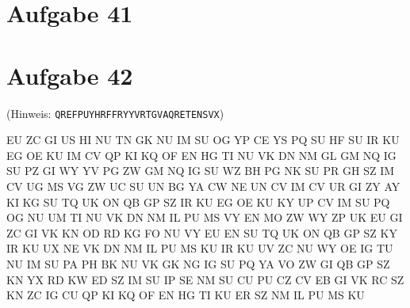 \section*{Aufgabe 41}
\section*{Aufgabe 42}
\begin{minipage}{0.45\textwidth}
\vspace{5em}

(Hinweis: \verb/QREFPUYHRFFRYYVRTGVAQRETENSVX/)
\end{minipage}\hfill\begin{minipage}{0.40\textwidth}
EU ZC GI US HI NU TN GK NU IM SU OG YP CE YS PQ SU HF SU IR KU EG OE KU IM CV
QP KI KQ OF EN HG TI NU VK DN NM GL GM NQ IG SU PZ GI WY YV PG ZW GM NQ IG SU
WZ BH PG NK SU PR GH SZ IM CV UG MS VG ZW UC SU UN BG YA CW NE UN CV IM CV UR
GI ZY AY KI KG SU TQ UK ON QB GP SZ IR KU EG OE KU KY UP CV IM SU PQ OG NU UM
TI NU VK DN NM IL PU MS VY EN MO ZW WY ZP UK EU GI ZC GI VK KN OD RD KG FO NU
VY EU EN SU TQ UK ON QB GP SZ KY IR KU UX NE VK DN NM IL PU MS KU IR KU UV ZC
NU WY OE IG TU NU IM SU PA PH BK NU VK GK NG IG SU PQ YA VO ZW GI QB GP SZ KN
YX RD KW ED SZ IM SU IP SE NM SU CU PU CZ CV EB GI VK RC SZ KN ZC IG CU QP KI
KQ OF EN HG TI KU ER SZ NM IL PU MS KU 
\end{minipage}

